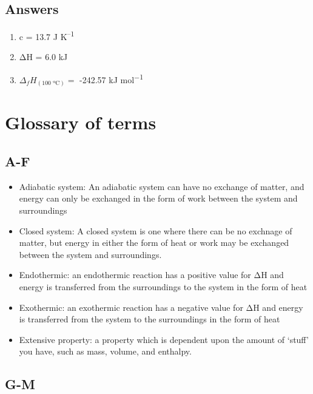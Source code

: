\documentclass[
]{book}
\providecommand{\tightlist}{%
  \setlength{\itemsep}{0pt}\setlength{\parskip}{0pt}}
\begin{document}
\hypertarget{answers}{%
\section{Answers}\label{answers}}

\begin{enumerate}
\def\labelenumi{\arabic{enumi}.}
\tightlist
\item
  c = 13.7 J K\textsuperscript{--1}
\item
  ΔH = 6.0 kJ
\item
  \(\Delta _f H _{(\textrm{100 ºC})}=\) -242.57 kJ mol\textsuperscript{−1}
\end{enumerate}

\hypertarget{glossary-of-terms}{%
\chapter*{Glossary of terms}\label{glossary-of-terms}}

\hypertarget{a-f}{%
\section*{A-F}\label{a-f}}

\begin{itemize}
\item
  Adiabatic system: An adiabatic system can have no exchange of matter, and energy can only be exchanged in the form of work between the system and surroundings
\item
  Closed system: A closed system is one where there can be no exchnage of matter, but energy in either the form of heat or work may be exchanged between the system and surroundings.
\item
  Endothermic: an endothermic reaction has a positive value for ΔH and energy is transferred from the surroundings to the system in the form of heat
\item
  Exothermic: an exothermic reaction has a negative value for ΔH and energy is transferred from the system to the surroundings in the form of heat
\item
  Extensive property: a property which is dependent upon the amount of `stuff' you have, such as mass, volume, and enthalpy.
\end{itemize}

\hypertarget{g-m}{%
\section*{G-M}\label{g-m}}
\end{document}
